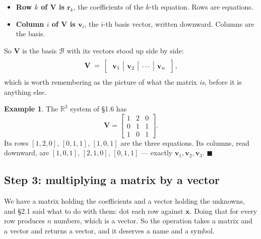 \documentclass[11pt]{article}
\theoremstyle{plain}
\theoremstyle{definition}
\newtheorem{ex}{Example}[section]
\theoremstyle{remark}
\newcommand{\R}{\mathbb{R}}
\newcommand{\vc}[1]{\mathbf{#1}}        %
\newcommand{\mt}[1]{\mathbf{#1}}        %
\newcommand{\bas}{\mathcal{B}}
\begin{document}
\begin{itemize}[leftmargin=1.4em,itemsep=4pt]
  \item \textbf{Row $k$ of $\mt{V}$ is $\vc{r}_k$}, the coefficients of the
        $k$-th equation. Rows are equations.
  \item \textbf{Column $i$ of $\mt{V}$ is $\vc{v}_i$}, the $i$-th basis vector,
        written downward. Columns are the basis.
\end{itemize}

\noindent So $\mt{V}$ is the basis $\bas$ with its vectors stood up side by side:
\[
  \mt{V} \;=\;
  \left[\;
  \begin{array}{c|c|c|c}
    \rule{0pt}{2.4ex}\vc{v}_1 & \vc{v}_2 & \cdots & \vc{v}_n
  \end{array}
  \;\right] ,
\]
which is worth remembering as the picture of what the matrix \emph{is}, before
it is anything else.

\begin{ex}
The $\R^{3}$ system of \S1.6 has
\[
  \mt{V} =
  \begin{bmatrix}
    1 & 2 & 0 \\
    0 & 1 & 1 \\
    1 & 0 & 1
  \end{bmatrix} .
\]
Its rows $[1,2,0]$, $[0,1,1]$, $[1,0,1]$ are the three equations. Its columns,
read downward, are $[1,0,1]$, $[2,1,0]$, $[0,1,1]$ --- exactly
$\vc{v}_1,\vc{v}_2,\vc{v}_3$. \hfill$\blacksquare$
\end{ex}

\subsection{Step 3: multiplying a matrix by a vector}
We have a matrix holding the coefficients and a vector holding the unknowns, and
\S2.1 said what to do with them: dot each row against $\vc{x}$. Doing that for
every row produces $n$ numbers, which is a vector. So the operation takes a
matrix and a vector and returns a vector, and it deserves a name and a symbol.
\end{document}
